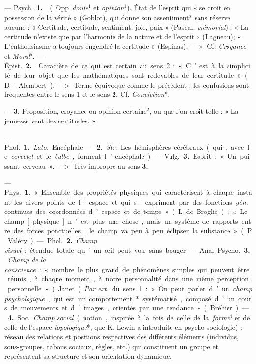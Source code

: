 \begin{itemize}[leftmargin=1cm, label=, itemsep=11pt]
 —  \si{Psych.} {\bf 1.}  (Opp.
{\it doute}$^1$ et {\it opinion}$^1$). État de l’esprit
qui « se croit en possession de la
vérité » (Goblot), qui donne son
assentiment* sans réserve aucune :
« Certitude, certitude, sentiment,
joie, paix » (Pascal, {\it mémorial}) ; « La
certitude n'existe que par l’harmonie de la nature et de l'esprit »
(Lagneau); « L’enthousiasme a toujours engendré la certitude » (Espinas), $->$ Cf. {\it Croyance} et {\it Moral}$^5$.
— \si{Épist.} {\bf 2.}  Caractère de ce qui
est certain au sens 2 : « C’est à la
simplicité de leur objet que les mathématiques sont redevables de leur
certitude » (D'Alembert). $->$ Terme
équivoque comme le précédent : les
confusions sont fréquentes entre le
sens 1 et le sens {\bf 2.} Cf. {\it Conviction}*.

—  {\bf 3.} Proposition, croyance
ou opinion certaine$^2$, ou que l’on
croit telle : « La jeunesse veut des
certitudes. »

 — \si{Phol.} {\bf 1.}  {\it Lato.} Encéphale.
— {\bf 2.}  {\it Str.} Les hémisphères cérébraux
(qui, avec le {\it cervelet} et le {\it bulbe}, forment l’encéphale).

— \si{Vulg.} {\bf 3.} Esprit : « Un puissant cerveau ». $->$ Très impropre
au sens {\bf 3.}


 — \si{Phys.} {\bf 1.} « Ensemble des
propriétés physiques qui caractérisent à chaque instant les divers
points de l’espace et qui s'expriment
par des fonctions  {\it gén.} continues des
coordonnées d’espace et de temps »
(L. de Broglie); « Le champ [physique] n’est plus une chose, mais un
système de rapports entre des forces
ponctuelles : le champ va peu à peu
éclipser la substance » (P. Valéry).
— \si{Phol.} {\bf 2.} {\it Champ visuel} : étendue totale qu’un œil peut voir sans bouger.

— Anal. \si{Psycho.} {\bf 3.} {\it Champ de la
conscience} : « nombre le plus grand
de phénomènes simples qui peuvent
être réunis, à chaque moment, à
notre personnalité dans une même
perception personnelle » (Janet).
{\it Par ext.} du sens 1 : « On peut parler
d’un {\it champ psychologique}, qui est
un comportement* systématisé,
composé d’un cours de mouvements
et d'images, orientés par une tendance » (Bréhier). — {\bf 4.} \si{Soc.} {\it Champ
social} (notion, inspirée à la fois de
celle de la {\it forme}$^4$ et de celle de
l’espace {\it topologique}*, que K. Lewin
a introduite en psycho-sociologie) :
réseau des relations et positions respectives des différents éléments
(individus, sous-groupes, tabous sociaux, règles, etc.) qui constituent
un groupe et représentent sa structure et son orientation dynamique.


\end{itemize}
